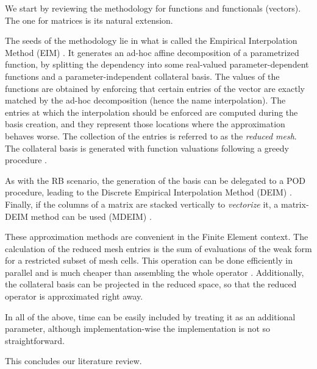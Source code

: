\documentclass[thesis.tex]{subfiles}
\begin{document}
We start by reviewing the methodology for functions and functionals (vectors).
The one for matrices is its natural extension.

The seeds of the methodology lie in what is called the 
Empirical Interpolation Method (EIM)
\cite{barrault:hal-00021702,
Casenave2014,
Nguyen2008}.
It generates an ad-hoc affine decomposition of a parametrized function,
by splitting the dependency into some real-valued parameter-dependent functions 
and a parameter-independent collateral basis.
The values of the functions are obtained by 
enforcing that certain entries of the vector are 
exactly matched by the ad-hoc decomposition
(hence the name interpolation).
The entries at which the interpolation should be enforced 
are computed during the basis creation,
and they represent those locations where the approximation behaves worse.
The collection of the entries is referred to as the \textit{reduced mesh}.
The collateral basis is generated with function valuations following
a greedy procedure 
\cite{Hesthaven2014}.

As with the RB scenario, 
the generation of the basis can be delegated to a POD procedure,
leading to the Discrete Empirical Interpolation Method (DEIM)
\cite{2010_nonlinearModelReductionDeim_chaturantabut,
2018_podDeimReducedOrderModelDeformingMeshAeroelasticApplications_Donfrancesco}.
Finally, if the columns of a matrix are stacked vertically to \textit{vectorize} it,
a matrix-DEIM method can be used (MDEIM)
\cite{2012_deimAPosterioriNonlinear_DinamicalSystems,
2015_efficientModelReductionParametrizedSystemsMatrixDeim_Negri,
mdeim_elasticity_problems}.

These approximation methods are convenient
in the Finite Element context.
The calculation of the reduced mesh entries is the sum of evaluations of the 
weak form for a restricted subset of mesh cells.
This operation can be done efficiently in parallel and 
is much cheaper than assembling the whole operator 
\cite{Santo_Manzoni_2019}.
Additionally, the collateral basis can be projected in the reduced space,
so that the reduced operator is approximated right away. 

In all of the above, 
time can be easily included by treating it as an additional parameter,
although implementation-wise the implementation is not so straightforward. 

This concludes our literature review.


\end{document}
